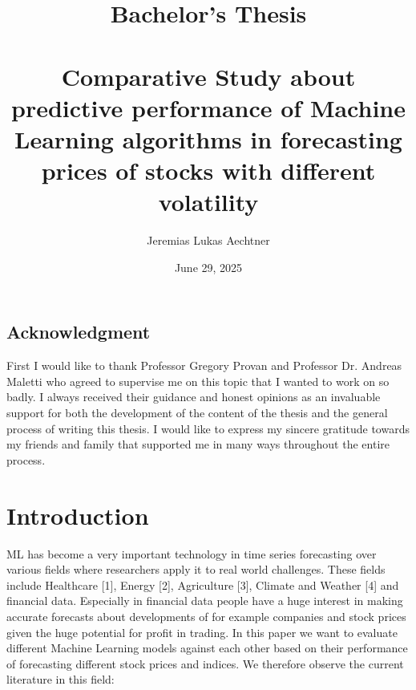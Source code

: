 \documentclass[a4paper,12pt]{report}
\title{Bachelor's Thesis\\ \
\\
Comparative Study about predictive performance of Machine Learning algorithms in forecasting prices of stocks with different volatility}
\author{Jeremias Lukas Aechtner}
\date{June 29, 2025}
\begin{document}
\maketitle


\section*{Acknowledgment}
First I would like to thank Professor Gregory Provan and Professor Dr. Andreas Maletti who agreed to supervise me on this topic that I wanted to work on so badly. I always received their guidance and honest opinions as an invaluable support for both the development of the content of the thesis and the general process of writing this thesis. I would like to express my sincere gratitude towards my friends and family that supported me in many ways throughout the entire process.
\newpage

\tableofcontents
\newpage






\chapter{Introduction}
ML has become a very important technology in time series forecasting over various fields where researchers apply it to real world challenges. These fields include Healthcare [1], Energy [2], Agriculture [3], Climate and Weather [4] and financial data. Especially in financial data people have a huge interest in making accurate forecasts about developments of for example companies and stock prices given the huge potential for profit in trading. 
In this paper we want to evaluate different Machine Learning models against each other based on their performance of forecasting different stock prices and indices. We therefore observe the current literature in this field:
\end{document}
